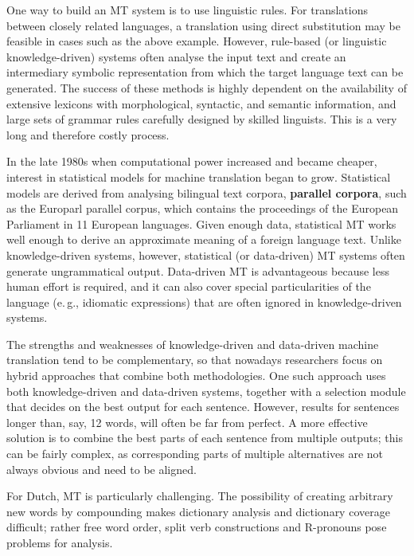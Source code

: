 \documentclass[]{../../metanetpaper}
\begin{document}
\begin{multicols}{2}
One way to build an MT system is to use linguistic rules. For translations between closely related languages, a translation using direct substitution may be feasible in cases such as the above example. However, rule-based (or linguistic knowledge-driven) systems often analyse the input text and create an intermediary symbolic representation from which the target language text can be generated. The success of these methods is highly dependent on the availability of extensive lexicons with morphological, syntactic, and semantic information, and large sets of grammar rules carefully designed by skilled linguists. This is a very long and therefore costly process.

In the late 1980s when computational power increased and became cheaper, interest in statistical models for machine translation began to grow. Statistical models are derived from analysing bilingual text corpora, \textbf{parallel corpora}, such as the Europarl parallel corpus, which contains the proceedings of the European Parliament in 11 European languages. Given enough data, statistical MT works well enough to derive an approximate meaning of a foreign language text. Unlike knowledge-driven systems, however, statistical (or data-driven) MT systems often generate ungrammatical output. Data-driven MT is advantageous because less human effort is required, and it can also cover special particularities of the language (e.\,g., idiomatic expressions) that are often ignored in knowledge-driven systems.

The strengths and weaknesses of knowledge-driven and data-driven machine translation tend to be complementary, so that nowadays researchers focus on hybrid approaches that combine both methodologies. One such approach uses both knowledge-driven and data-driven systems, together with a selection module that decides on the best output for each sentence. However, results for sentences longer than, say, 12 words, will often be far from perfect. A more effective solution is to combine the best parts of each sentence from multiple outputs; this can be fairly complex, as corresponding parts of multiple alternatives are not always obvious and need to be aligned.


 For Dutch, MT is particularly challenging. The possibility of creating arbitrary new words by compounding makes dictionary analysis and dictionary coverage difficult; rather free word order, split verb constructions and R-pronouns pose problems for analysis.


\end{multicols}
\end{document}
